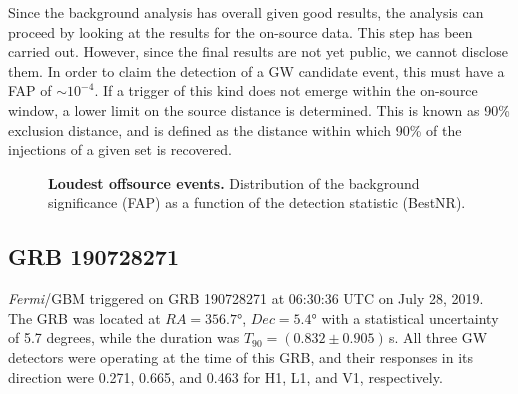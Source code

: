 \documentclass[binding=0.6cm, LaM]{sapthesis}
\begin{document}
	Since the background analysis has overall given good results,
	the analysis can proceed by looking at the results for the on-source data.
	This step has been carried out. However, since the final results are not yet public, we cannot disclose them.
	In order to claim the detection of a GW candidate event, this 
	must have a FAP of $\sim 10^{-4}$.  If a trigger of this kind does not emerge within the on-source window,
	a lower limit on the source distance is determined. 
        This is known as 90\% exclusion distance, and is
	defined as the distance within which 90\% of the injections of a given set is recovered.

        \begin{figure}[!t]
          \noindent
          \label{loudestoffsourcevent1}
          \centering
          \caption{\textbf{Loudest offsource events.} Distribution of the background significance (FAP) as a function of the detection statistic (BestNR).}
          \label{fig:loudestoffsourcevent1}
        \end{figure}

\subsection{GRB 190728271}
        {\it Fermi}/GBM triggered on GRB 190728271 at 06:30:36 UTC on July 28, 2019.
        The GRB was located at $RA = \ang{356.7}$, $Dec = \ang{5.4}$
        with a statistical uncertainty of 5.7 degrees, while the duration was $T_{90} = (0.832 \pm 0.905)\,$s.
        All three GW detectors were operating at the time of this GRB,
        and their responses in its direction were 0.271, 0.665, and 0.463 for H1, L1, and V1, respectively.
\end{document}
